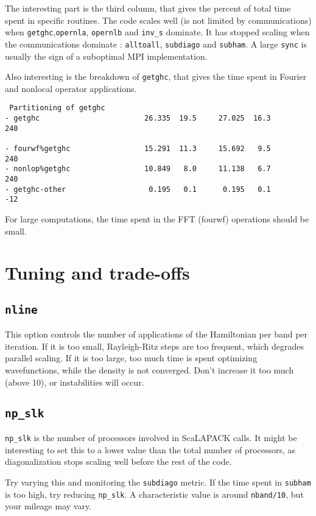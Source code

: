 \documentclass[11pt]{article}
\begin{document}
The interesting part is the third column, that gives the percent of
total time spent in specific routines. The code scales well (is not
limited by communications) when \texttt{getghc},\texttt{opernla},
\texttt{opernlb} and \texttt{inv\_s} dominate. It has stopped scaling
when the communications dominate : \texttt{alltoall},
\texttt{subdiago} and \texttt{subham}. A large \texttt{sync} is
usually the sign of a suboptimal MPI implementation.

Also interesting is the breakdown of \texttt{getghc}, that gives the
time spent in Fourier and nonlocal operator applications. 
\begin{verbatim}
 Partitioning of getghc
- getghc                        26.335  19.5     27.025  16.3            240
 
- fourwf%getghc                 15.291  11.3     15.692   9.5            240
- nonlop%getghc                 10.849   8.0     11.138   6.7            240
- getghc-other                   0.195   0.1      0.195   0.1            -12
\end{verbatim}

For large computations, the time spent in the FFT (fourwf) operations
should be small.

\section{Tuning and trade-offs}
\subsection{\texttt{nline}}
This option controls the number of applications of the Hamiltonian per
band per iteration. If it is too small, Rayleigh-Ritz steps are too
frequent, which degrades parallel scaling. If it is too large, too
much time is spent optimizing wavefunctions, while the density is not
converged. Don't increase it too much (above 10), or instabilities
will occur.
\subsection{\texttt{np\_slk}}
\texttt{np\_slk} is the number of processors involved in ScaLAPACK
calls. It might be interesting to set this to a lower value than the
total number of processors, as diagonalization stops scaling well
before the rest of the code.

Try varying this and monitoring the \texttt{subdiago} metric. If the
time spent in \texttt{subham} is too high, try reducing
\texttt{np\_slk}. A characteristic value is around \texttt{nband/10},
but your mileage may vary. 
\end{document}

